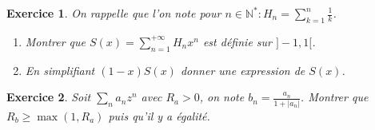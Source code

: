 \documentclass[12pt,a4paper]{article}
\newcommand{\N}{\mathbb{N}}
\theoremstyle{break}
\theoremstyle{break}
\newtheorem{Exo}{Exercice}
\begin{document}
\begin{Exo}
	On rappelle que l'on note pour $n\in\N^*:H_n=\sum_{k=1}^{n}\frac{1}{k}$. 
	\begin{enumerate}
		\item
		Montrer que $S(x)=\sum_{n=1}^{+\infty}H_n x^n$ est définie sur $]-1,1[$. 
		\item
		En simplifiant $(1-x)S(x)$ donner une expression de $S(x)$. 
	\end{enumerate}


\end{Exo}



	


	
	
	


	
\begin{Exo}
		Soit $\sum_n a_n z^n$ avec $R_a>0$, on note $b_n=\frac{a_n}{1+\lvert a_n\rvert}$. Montrer que $R_b\geqslant \max(1,R_a)$ puis qu'il y a égalité.	
\end{Exo}
	
	
%		
	
\end{document}
